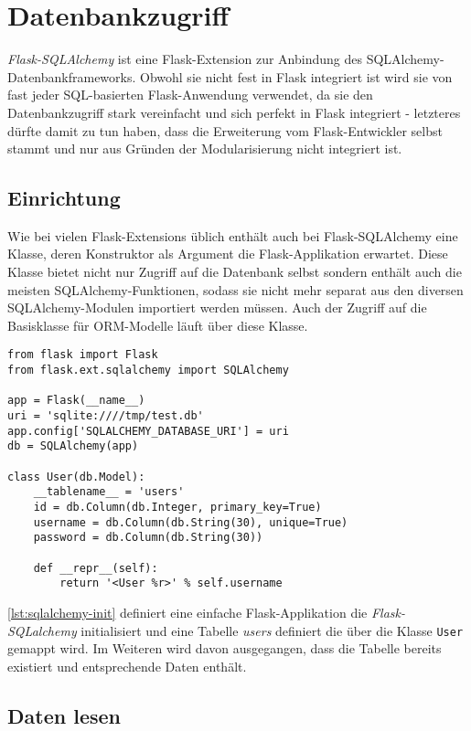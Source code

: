 \section{Datenbankzugriff}

\emph{Flask-SQLAlchemy} ist eine Flask-Extension zur Anbindung des SQLAlchemy-Datenbankframeworks.
Obwohl sie nicht fest in Flask integriert ist wird sie von fast jeder SQL-basierten Flask-Anwendung
verwendet, da sie den Datenbankzugriff stark vereinfacht und sich perfekt in Flask integriert -
letzteres dürfte damit zu tun haben, dass die Erweiterung vom Flask-Entwickler selbst stammt und nur
aus Gründen der Modularisierung nicht integriert ist.

\subsection{Einrichtung}

Wie bei vielen Flask-Extensions üblich enthält auch bei Flask-SQLAlchemy eine Klasse, deren
Konstruktor als Argument die Flask-Applikation erwartet. Diese Klasse bietet nicht nur Zugriff auf
die Datenbank selbst sondern enthält auch die meisten SQLAlchemy-Funktionen, sodass sie nicht mehr
separat aus den diversen SQLAlchemy-Modulen importiert werden müssen. Auch der Zugriff auf die
Basisklasse für ORM-Modelle läuft über diese Klasse.

\begin{lstlisting}[caption=Flask-SQLAlchemy-Grundstruktur,label=lst:sqlalchemy-init]
from flask import Flask
from flask.ext.sqlalchemy import SQLAlchemy

app = Flask(__name__)
uri = 'sqlite:////tmp/test.db'
app.config['SQLALCHEMY_DATABASE_URI'] = uri
db = SQLAlchemy(app)

class User(db.Model):
    __tablename__ = 'users'
    id = db.Column(db.Integer, primary_key=True)
    username = db.Column(db.String(30), unique=True)
    password = db.Column(db.String(30))

    def __repr__(self):
        return '<User %r>' % self.username
\end{lstlisting}

\autoref{lst:sqlalchemy-init} definiert eine einfache Flask-Applikation die \emph{Flask-SQLalchemy}
initialisiert und eine Tabelle \emph{users} definiert die über die Klasse \lstinline{User} gemappt
wird. Im Weiteren wird davon ausgegangen, dass die Tabelle bereits existiert und entsprechende Daten
enthält.

\subsection{Daten lesen}

